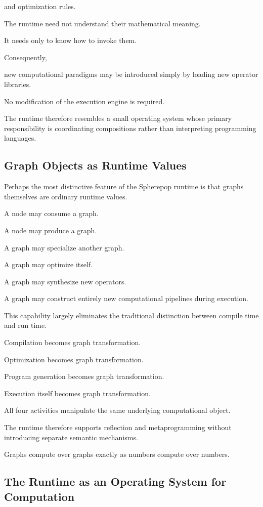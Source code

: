\documentclass[12pt,oneside]{article}
\begin{document}
and optimization rules.

The runtime need not understand their mathematical meaning.

It needs only to know how to invoke them.

Consequently,

new computational paradigms may be introduced simply by loading new operator libraries.

No modification of the execution engine is required.

The runtime therefore resembles a small operating system whose primary responsibility is coordinating compositions rather than interpreting programming languages.

\subsection{Graph Objects as Runtime Values}

Perhaps the most distinctive feature of the Spherepop runtime is that graphs themselves are ordinary runtime values.

A node may consume a graph.

A node may produce a graph.

A graph may specialize another graph.

A graph may optimize itself.

A graph may synthesize new operators.

A graph may construct entirely new computational pipelines during execution.

This capability largely eliminates the traditional distinction between compile time and run time.

Compilation becomes graph transformation.

Optimization becomes graph transformation.

Program generation becomes graph transformation.

Execution itself becomes graph transformation.

All four activities manipulate the same underlying computational object.

The runtime therefore supports reflection and metaprogramming without introducing separate semantic mechanisms.

Graphs compute over graphs exactly as numbers compute over numbers.

\subsection{The Runtime as an Operating System for Computation}
\end{document}
